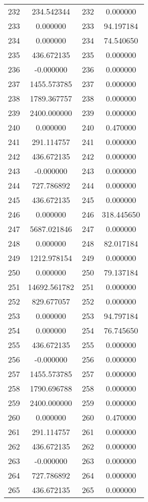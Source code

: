 \documentclass[12pt]{article}
\begin{document}
\begin{longtable}{@{}cccc@{}}
232 & 234.542344 & 232 & 0.000000 \\
233 & 0.000000 & 233 & 94.197184 \\
234 & 0.000000 & 234 & 74.540650 \\
235 & 436.672135 & 235 & 0.000000 \\
236 & -0.000000 & 236 & 0.000000 \\
237 & 1455.573785 & 237 & 0.000000 \\
238 & 1789.367757 & 238 & 0.000000 \\
239 & 2400.000000 & 239 & 0.000000 \\
240 & 0.000000 & 240 & 0.470000 \\
241 & 291.114757 & 241 & 0.000000 \\
242 & 436.672135 & 242 & 0.000000 \\
243 & -0.000000 & 243 & 0.000000 \\
244 & 727.786892 & 244 & 0.000000 \\
245 & 436.672135 & 245 & 0.000000 \\
246 & 0.000000 & 246 & 318.445650 \\
247 & 5687.021846 & 247 & 0.000000 \\
248 & 0.000000 & 248 & 82.017184 \\
249 & 1212.978154 & 249 & 0.000000 \\
250 & 0.000000 & 250 & 79.137184 \\
251 & 14692.561782 & 251 & 0.000000 \\
252 & 829.677057 & 252 & 0.000000 \\
253 & 0.000000 & 253 & 94.797184 \\
254 & 0.000000 & 254 & 76.745650 \\
255 & 436.672135 & 255 & 0.000000 \\
256 & -0.000000 & 256 & 0.000000 \\
257 & 1455.573785 & 257 & 0.000000 \\
258 & 1790.696788 & 258 & 0.000000 \\
259 & 2400.000000 & 259 & 0.000000 \\
260 & 0.000000 & 260 & 0.470000 \\
261 & 291.114757 & 261 & 0.000000 \\
262 & 436.672135 & 262 & 0.000000 \\
263 & -0.000000 & 263 & 0.000000 \\
264 & 727.786892 & 264 & 0.000000 \\
265 & 436.672135 & 265 & 0.000000 \\

\end{longtable}
\end{document}
